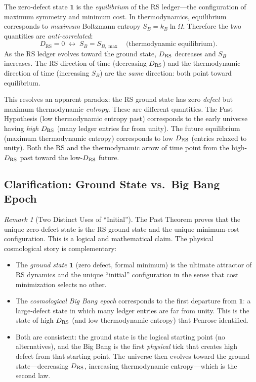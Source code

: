 \documentclass[12pt,a4paper]{article}
\theoremstyle{definition}
\theoremstyle{remark}
\newtheorem{remark}[theorem]{Remark}
\begin{document}
The zero-defect state $\mathbf{1}$ is the \emph{equilibrium} of the RS
ledger---the configuration of maximum symmetry and minimum cost.  In
thermodynamics, equilibrium corresponds to \emph{maximum} Boltzmann
entropy $S_B = k_B \ln \Omega$.  Therefore the two quantities are
\emph{anti-correlated}:
\[
  D_{\mathrm{RS}} = 0 \;\longleftrightarrow\; S_B = S_{B,\max}
  \quad\text{(thermodynamic equilibrium)}.
\]
As the RS ledger evolves toward the ground state, $D_{\rm RS}$ decreases
and $S_B$ increases.  The RS direction of time (decreasing $D_{\rm RS}$)
and the thermodynamic direction of time (increasing $S_B$) are the
\emph{same} direction: both point toward equilibrium.

This resolves an apparent paradox: the RS ground state has zero
\emph{defect} but maximum thermodynamic \emph{entropy}.  These are
different quantities.  The Past Hypothesis (low thermodynamic entropy
past) corresponds to the early universe having \emph{high} $D_{\rm RS}$
(many ledger entries far from unity).  The future equilibrium (maximum
thermodynamic entropy) corresponds to low $D_{\rm RS}$ (entries relaxed
to unity).  Both the RS and the thermodynamic arrow of time point from
the high-$D_{\rm RS}$ past toward the low-$D_{\rm RS}$ future.

\subsection{Clarification: Ground State vs.\ Big Bang Epoch}

\begin{remark}[Two Distinct Uses of ``Initial'']
The Past Theorem proves that the unique zero-defect state is the
RS ground state and the unique minimum-cost configuration.  This is
a logical and mathematical claim.  The physical cosmological story
is complementary:
\begin{itemize}
  \item The \emph{ground state} $\mathbf{1}$ (zero defect, formal
  minimum) is the ultimate attractor of RS dynamics and the unique
  ``initial'' configuration in the sense that cost minimization
  selects no other.
  \item The \emph{cosmological Big Bang epoch} corresponds to the first
  departure from $\mathbf{1}$: a large-defect state in which many
  ledger entries are far from unity.  This is the state of high
  $D_{\rm RS}$ (and low thermodynamic entropy) that Penrose identified.
  \item Both are consistent: the ground state is the logical starting
  point (no alternatives), and the Big Bang is the first
  \emph{physical} tick that creates high defect from that starting
  point.  The universe then evolves toward the ground state---decreasing
  $D_{\rm RS}$, increasing thermodynamic entropy---which is the second
  law.
\end{itemize}
\end{remark}
\end{document}
